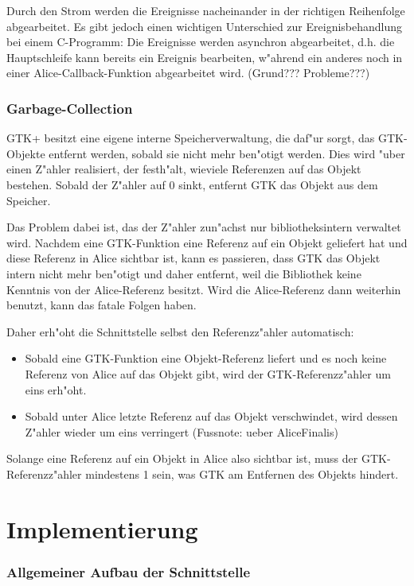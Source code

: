 \documentclass{article}
\begin{document}
Durch den Strom werden die Ereignisse nacheinander in der richtigen
Reihenfolge abgearbeitet. Es gibt jedoch einen wichtigen Unterschied
zur Ereignisbehandlung bei einem C-Programm: Die Ereignisse werden asynchron
abgearbeitet, d.h. die Hauptschleife kann bereits ein Ereignis bearbeiten,
w"ahrend ein anderes noch in einer Alice-Callback-Funktion abgearbeitet wird.
(Grund??? Probleme???)

\section{Garbage-Collection}

GTK+ besitzt eine eigene interne Speicherverwaltung, die daf"ur sorgt,
das GTK-Objekte entfernt werden, sobald sie nicht mehr ben"otigt werden.
Dies wird "uber einen Z"ahler realisiert, der festh"alt, wieviele
Referenzen auf das Objekt bestehen. Sobald der Z"ahler auf 0 sinkt,
entfernt GTK das Objekt aus dem Speicher.

Das Problem dabei ist, das der Z"ahler zun"achst nur bibliotheksintern
verwaltet wird. Nachdem eine GTK-Funktion eine Referenz
auf ein Objekt geliefert hat und diese Referenz in Alice sichtbar ist,
kann es passieren, dass GTK das Objekt intern nicht mehr ben"otigt und
daher entfernt, weil die Bibliothek keine Kenntnis von der Alice-Referenz
besitzt. Wird die Alice-Referenz dann weiterhin benutzt, kann das fatale
Folgen haben.

Daher erh"oht die Schnittstelle selbst den Referenzz"ahler automatisch:

\begin{itemize}
\item Sobald eine GTK-Funktion eine Objekt-Referenz liefert und es noch keine
      Referenz von Alice auf das Objekt gibt, wird der GTK-Referenzz"ahler
      um eins erh"oht.
\item Sobald unter Alice letzte Referenz auf das Objekt verschwindet, wird
      dessen Z"ahler wieder um eins verringert (Fussnote: ueber AliceFinalis)
\end{itemize}

Solange eine Referenz auf ein Objekt in Alice also sichtbar ist, muss der
GTK-Referenzz"ahler mindestens 1 sein, was GTK am Entfernen des Objekts
hindert.


\part{Implementierung}

\section{Allgemeiner Aufbau der Schnittstelle}
\end{document}
